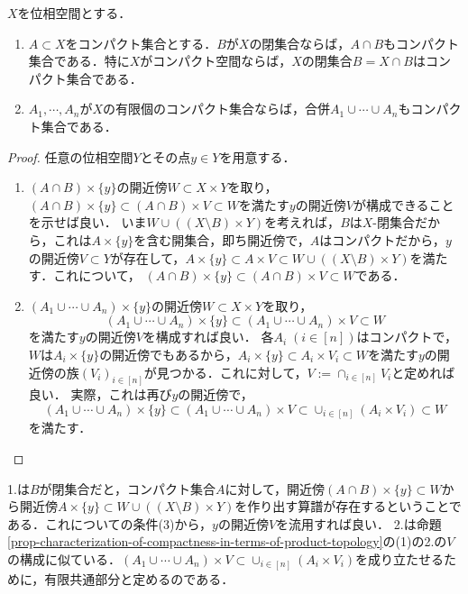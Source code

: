 \documentclass[uplatex,dvipdfmx]{jsreport}
\begin{document}
\begin{corollary}\label{cor-union-intersection-of-compact-sets-is-compact}
    $X$を位相空間とする．
    \begin{enumerate}
        \item $A\subset X$をコンパクト集合とする．$B$が$X$の閉集合ならば，$A\cap B$もコンパクト集合である．特に$X$がコンパクト空間ならば，$X$の閉集合$B=X\cap B$はコンパクト集合である．
        \item $A_1,\cdots,A_n$が$X$の有限個のコンパクト集合ならば，合併$A_1\cup\cdots\cup A_n$もコンパクト集合である．
    \end{enumerate}
\end{corollary}
\begin{proof}
    任意の位相空間$Y$とその点$y\in Y$を用意する．
    \begin{enumerate}
        \item $(A\cap B)\times\{y\}$の開近傍$W\subset X\times Y$を取り，$(A\cap B)\times\{y\}\subset (A\cap B)\times V\subset W$を満たす$y$の開近傍$V$が構成できることを示せば良い．
        いま$W\cup((X\setminus B)\times Y)$を考えれば，$B$は$X$-閉集合だから，これは$A\times\{y\}$を含む開集合，即ち開近傍で，$A$はコンパクトだから，$y$の開近傍$V\subset Y$が存在して，$A\times\{y\}\subset A\times V\subset W\cup((X\setminus B)\times Y)$を満たす．これについて，
        $(A\cap B)\times\{y\}\subset(A\cap B)\times V\subset W$である．
        \item 
        $(A_1\cup\cdots\cup A_n)\times\{y\}$の開近傍$W\subset X\times Y$を取り，
        \[(A_1\cup\cdots\cup A_n)\times\{y\}\subset (A_1\cup\cdots\cup A_n)\times V\subset W\]
        を満たす$y$の開近傍$V$を構成すれば良い．
        各$A_i\;(i\in[n])$はコンパクトで，$W$は$A_i\times\{y\}$の開近傍でもあるから，$A_i\times\{y\}\subset A_i\times V_i\subset W$を満たす$y$の開近傍の族$(V_i)_{i\in[n]}$が見つかる．これに対して，$V:=\cap_{i\in[n]}V_i$と定めれば良い．
        実際，これは再び$y$の開近傍で，
        \[(A_1\cup\cdots\cup A_n)\times\{y\}\subset (A_1\cup\cdots\cup A_n)\times V\subset\cup_{i\in[n]}(A_i\times V_i)\subset W\]
        を満たす．
    \end{enumerate}
\end{proof}
\begin{remarks}
    1.は$B$が閉集合だと，コンパクト集合$A$に対して，開近傍$(A\cap B)\times\{y\}\subset W$から開近傍$A\times\{y\}\subset W\cup((X\setminus B)\times Y)$を作り出す算譜が存在するということである．これについての条件(3)から，$y$の開近傍$V$を流用すれば良い．
    2.は命題\ref{prop-characterization-of-compactness-in-terms-of-product-topology}の(1)の2.の$V$の構成に似ている．$(A_1\cup\cdots\cup A_n)\times V\subset\cup_{i\in[n]}(A_i\times V_i)$を成り立たせるために，有限共通部分と定めるのである．
\end{remarks}
\end{document}
